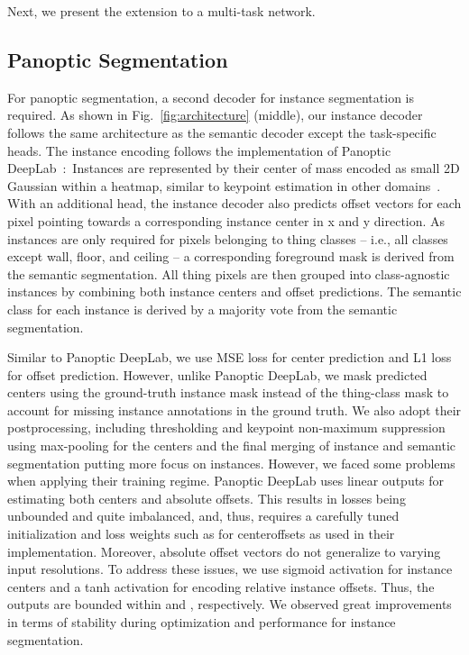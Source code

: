 \documentclass[conference]{IEEEtran}
\begin{document}
Next, we present the extension to a multi-task network.

\subsection{Panoptic Segmentation}
\label{sec:main:panoptic_segmentation}
For panoptic segmentation, a second decoder for instance segmentation is required.
As shown in Fig.~\ref{fig:architecture} (middle), our instance decoder follows the same architecture as the semantic decoder except the task-specific heads.
The instance encoding follows the implementation of Panoptic DeepLab~\cite{PanopticDeeplab-cvpr2020}:~Instances are represented by their center of mass encoded as small 2D Gaussian within a heatmap, similar to keypoint estimation in other domains~\cite{OpenPose-cvpr2017}.
With an additional head, the instance decoder also predicts offset vectors for each pixel pointing towards a corresponding instance center in x and y direction.
As instances are only required for pixels belonging to thing classes -- i.e., all classes except wall, floor, and ceiling -- a corresponding foreground mask is derived from the semantic segmentation.
All thing pixels are then grouped into class-agnostic instances by combining both instance centers and offset predictions.
The semantic class for each instance is derived by a majority vote from the semantic segmentation.

Similar to Panoptic DeepLab, we use MSE loss for center prediction and L1 loss for offset prediction.
However, unlike Panoptic DeepLab, we mask predicted centers using the ground-truth instance mask instead of the thing-class mask to account for missing instance annotations in the ground truth. 
We also adopt their postprocessing, including thresholding and keypoint non-maximum suppression using max-pooling for the centers and the final merging of instance and semantic segmentation putting more focus on instances.
However, we faced some problems when applying their training regime. 
Panoptic DeepLab uses linear outputs for estimating both centers and absolute offsets.
This results in losses being unbounded and quite imbalanced, and, thus, requires a carefully tuned initialization and loss weights such as  for centeroffsets as used in their implementation.
Moreover, absolute offset vectors do not generalize to varying input resolutions.
To address these issues, we use sigmoid activation for instance centers and a tanh activation for encoding relative instance offsets.
Thus, the outputs are bounded within  and , respectively.
We observed great improvements in terms of stability during optimization and performance for instance segmentation.
\end{document}
